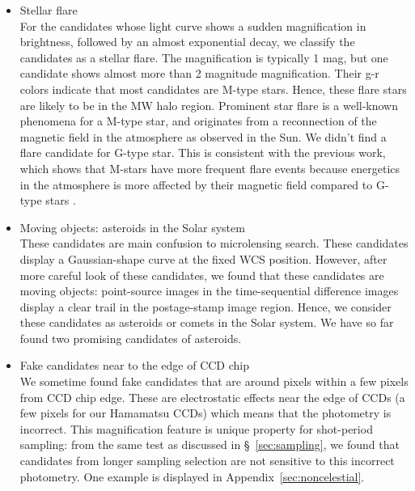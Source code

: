 \documentclass[iop, apj]{emulateapj}
\newcommand{\?}{\stackrel{?}{=}}
\begin{document}
\begin{itemize}
	\item Stellar flare\\
	For the candidates whose light curve shows a sudden magnification in brightness, followed by an almost exponential decay, we classify the candidates as a stellar flare. The magnification is typically 1 mag, but one candidate shows almost more than 2 magnitude magnification. Their g-r colors indicate that most candidates are M-type stars. Hence, these flare stars are likely to be in the MW halo region. 
	Prominent star flare is a well-known phenomena for a M-type star, and originates from a reconnection of the magnetic field in the atmosphere as observed in the Sun. 
	We didn't find a flare candidate for G-type star. This is consistent with the previous work, which shows that M-stars have more frequent flare events because energetics in the atmosphere is more affected by their magnetic field compared to G-type stars \citep{Moffett:74, Lacyetal:76, HenryNewsom:96}.

	

	\item Moving objects: asteroids in the Solar system\\
	These candidates are main confusion to microlensing search. These candidates display a Gaussian-shape curve at the fixed WCS position. However, after more careful look of these candidates, we found that these candidates are moving objects: point-source images in the time-sequential difference images display a clear trail in the postage-stamp image region. Hence, we consider these candidates as asteroids or comets in the Solar system. 
	We have so far found two promising candidates of asteroids. 

		
	\item Fake candidates near to the edge of CCD chip \\
	We sometime found fake candidates that are around pixels within a few pixels from CCD chip edge. 
	These are electrostatic effects near the edge of CCDs (a few pixels for our Hamamatsu CCDs) 
	which means that the photometry is incorrect. 
	This magnification feature is unique property for shot-period sampling:  
	from the same test as discussed in \S~\ref{sec:sampling}, 
	we found that candidates from longer sampling selection are not sensitive to this incorrect photometry. 
	One example is displayed in Appendix~\ref{sec:noncelestial}. 
	

\end{itemize}
\end{document}
